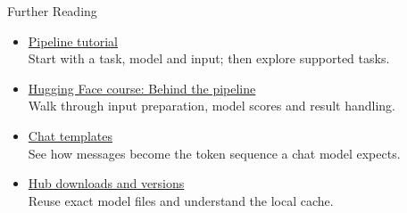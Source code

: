 \documentclass[aspectratio=169]{beamer}
\begin{document}
\begin{frame}{Further Reading}
  \begin{itemize}
    \item \href{https://huggingface.co/docs/transformers/en/pipeline_tutorial}{Pipeline tutorial}\\Start with a task, model and input; then explore supported tasks.
    \item \href{https://huggingface.co/learn/llm-course/chapter2/2}{Hugging Face course: Behind the pipeline}\\Walk through input preparation, model scores and result handling.
    \item \href{https://huggingface.co/docs/transformers/en/chat_templating}{Chat templates}\\See how messages become the token sequence a chat model expects.
    \item \href{https://huggingface.co/docs/huggingface_hub/en/guides/download}{Hub downloads and versions}\\Reuse exact model files and understand the local cache.
  \end{itemize}
\end{frame}
\end{document}
